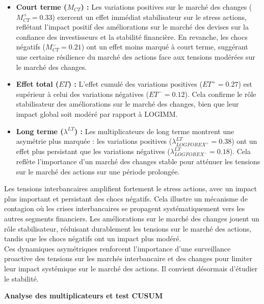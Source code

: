\begin{itemize}
    \item \textbf{Court terme (\(M_{CT}\)) :} 
    Les variations positives sur le marché des changes (\(M_{CT}^+ = 0.33\)) exercent un effet immédiat stabilisateur sur le stress actions, reflétant l’impact positif des améliorations sur le marché des devises sur la confiance des investisseurs et la stabilité financière.  
    En revanche, les chocs négatifs (\(M_{CT}^- = 0.21\)) ont un effet moins marqué à court terme, suggérant une certaine résilience du marché des actions face aux tensions modérées sur le marché des changes.

    \item \textbf{Effet total (\(ET\)) :} 
    L’effet cumulé des variations positives (\(ET^+ = 0.27\)) est supérieur à celui des variations négatives (\(ET^- = 0.12\)). Cela confirme le rôle stabilisateur des améliorations sur le marché des changes, bien que leur impact global soit modéré par rapport à LOGIMM.

    \item \textbf{Long terme (\(\lambda^{LT}\)) :} 
    Les multiplicateurs de long terme montrent une asymétrie plus marquée : les variations positives (\(\lambda^{LT}_{LOGFOREX^+} = 0.38\)) ont un effet plus persistant que les variations négatives (\(\lambda^{LT}_{LOGFOREX^-} = 0.18\)). Cela reflète l’importance d’un marché des changes stable pour atténuer les tensions sur le marché des actions sur une période prolongée.
\end{itemize}

Les tensions interbancaires amplifient fortement le stress actions, avec un impact plus important et persistant des chocs négatifs. Cela illustre un mécanisme de contagion où les crises interbancaires se propagent systématiquement vers les autres segments financiers. Les améliorations sur le marché des changes jouent un rôle stabilisateur, réduisant durablement les tensions sur le marché des actions, tandis que les chocs négatifs ont un impact plus modéré.\\

Ces dynamiques asymétriques renforcent l'importance d'une surveillance proactive des tensions sur les marchés interbancaire et des changes pour limiter leur impact systémique sur le marché des actions. Il convient désormais d'étudier le stabilité.

\vspace{0.5cm}

\textbf{Analyse des multiplicateurs et test CUSUM} \\

